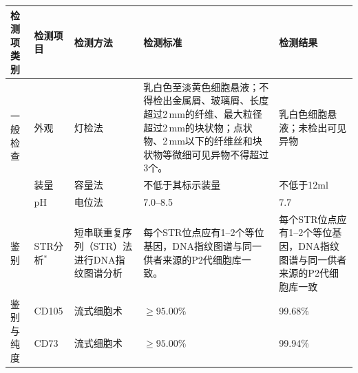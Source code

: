 \documentclass[UTF8,10pt,a4paper,fontset=fandol]{ctexart}
\newcommand{\fieldvalue}[1]{#1}
\begin{document}
\begin{center}
\scriptsize
\begin{tabular}{|p{1.55cm}|p{1.85cm}|p{2.45cm}|p{6.70cm}|p{3.55cm}|}
\hline
检测项类别 & 检测项目 & 检测方法 & 检测标准 & 检测结果\\ \hline
\multirow{2}{*}{一般检查}
& 外观 &
\fieldvalue{灯检法}
&
\fieldvalue{乳白色至淡黄色细胞悬液；不得检出金属屑、玻璃屑、长度超过2\,mm的纤维、最大粒径超过2\,mm的块状物；点状物、2\,mm以下的纤维丝和块状物等微细可见异物不得超过3个。}
&
\fieldvalue{乳白色细胞悬液；未检出可见异物}
\\ \cline{2-5}
& 装量 &
\fieldvalue{容量法}
&
\fieldvalue{不低于其标示装量}
&
\fieldvalue{不低于12ml}
\\ \hline
& pH &
\fieldvalue{电位法}
&
\fieldvalue{7.0--8.5}
&
\fieldvalue{7.7}
\\ \hline
鉴别
& STR分析$^{*}$ &
\fieldvalue{短串联重复序列（STR）法进行DNA指纹图谱分析}
&
\fieldvalue{每个STR位点应有1--2个等位基因，DNA指纹图谱与同一供者来源的P2代细胞库一致。}
&
\fieldvalue{每个STR位点应有1--2个等位基因，DNA指纹图谱与同一供者来源的P2代细胞库一致}
\\ \hline
\multirow{7}{*}{鉴别与纯度}
& CD105 &
\fieldvalue{流式细胞术}
&
\fieldvalue{$\geq95.00\%$}
&
\fieldvalue{99.68\%}
\\ \cline{2-5}
& CD73 &
\fieldvalue{流式细胞术}
&
\fieldvalue{$\geq95.00\%$}
&
\fieldvalue{99.94\%}
\\ \cline{2-5}

\end{tabular}
\end{center}
\end{document}
